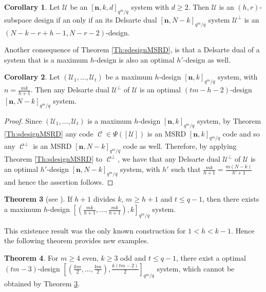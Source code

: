 \documentclass[11pt]{amsart}
\DeclareMathOperator{\C}{\mathcal{C}}
\theoremstyle{definition}
\newtheorem{theorem}{Theorem}[section]
\newtheorem{corollary}[theorem]{Corollary}
\newcommand{\bfn}{\mathbf {n}}
\newcommand{\Fmnkd}{[\bfn,k,d]_{q^m/q}}
\begin{document}
\begin{corollary}
Let $\mathcal{U}$ be an $\Fmnkd$ system with $d \geq 2$. Then $\mathcal{U}$ is an $(h,r)$-subspace design if an only if an its Delsarte dual $[\bfn,N-k]_{q^m/q}$ system $\mathcal{U}^{\perp}$ is an $(N-k-r+h-1,N-r-2)$-design.
   
\end{corollary}


Another consequence of Theorem \ref{Th:sdesignMSRD}, is that a Delsarte dual of a system that is a maximum $h$-design is also an optimal $h'$-design as well.

\begin{corollary} \label{cor:dualofmaximumdesign}
    Let $(\mathcal{U}_1,\ldots,\mathcal{U}_t)$ be a maximum  $h$-design $[\bfn,k]_{q^m/q}$ system, with $n=\frac{mk}{h+1}$. Then any Delsarte dual $\mathcal{U}^{\perp}$ of $\mathcal{U}$ is an optimal $(tm-h-2)$-design $[\bfn,N-k]_{q^m/q}$ system.
\end{corollary}

\begin{proof}
    Since $(\mathcal{U}_1,\ldots,\mathcal{U}_t)$ is a maximum  $h$-design $[\bfn,k]_{q^m/q}$ system, by Theorem  \ref{Th:sdesignMSRD} any code $\C \in \Psi([\mathcal{U}])$ is an MSRD $[\bfn,k]_{q^m/q}$ code and so any $\C^{\perp}$ is an MSRD $[\bfn,N-k]_{q^m/q}$ code as well. Therefore, by applying Theorem \ref{Th:sdesignMSRD} to $\C^{\perp}$, we have that any Delsarte dual $\mathcal{U}^{\perp}$ of $\mathcal{U}$ is an optimal $h'$-design $[\bfn,N-k]_{q^m/q}$ system, with $h'$ such that $\frac{mk}{h+1}=\frac{m(N-k)}{h'+1}$ and hence the assertion follows.
\end{proof}


\begin{theorem} [see \textnormal{\cite[Theorem 5.8]{santonastaso2022subspace}}] \label{th:applincollamento}
    If $h+1$ divides $k$, $m \geq h+1$ and $t\leq q-1$, then there exists a maximum $h$-design $\left[\left(\frac{mk}{h+1},\ldots,\frac{mk}{h+1}\right),k\right]_{q^m/q}$ system.
\end{theorem}


This existence result was the only known construction for $1<h<k-1$. Hence the following theorem provides new examples.

\begin{theorem}
    For $m \geq 4$ even, $k \geq 3$ odd and $t \leq q-1$, there exist a optimal $(tm-3)$-design $\left[(\frac{km}{2},\ldots,\frac{km}{2}),\frac{k(tm-2)}{2}\right]_{q^m/q}$ system, which cannot be obtained by Theorem \ref{th:applincollamento}.
\end{theorem}
\end{document}
